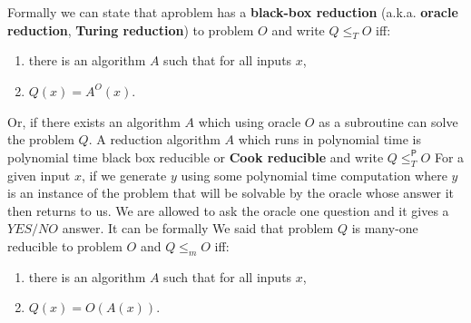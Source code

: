 Formally we can state that aproblem has a \textbf{black-box reduction} (a.k.a. \textbf{oracle reduction}, \textbf{Turing reduction}) to problem $O$ and write $Q \leq_T O$ iff:
\begin{enumerate}[nolistsep]
    \item there is an algorithm $A$ such that for all inputs $x$,
    \item $Q(x) = A^O(x)$.
\end{enumerate}

Or, if there exists an algorithm $A$ which using oracle $O$ as a subroutine can solve the problem $Q$. A reduction algorithm $A$ which runs in polynomial time is polynomial time black box reducible or \textbf{Cook reducible} and 
write $Q\leq^\mathsf{P}_T O$ For a given input $x$,  if we generate $y$ using some polynomial time computation where $y$ is an instance of the problem that will be solvable by the oracle whose answer it then returns to us. We are allowed to ask the oracle one question and it gives a $YES/NO$ answer. It can be formally We said that problem $Q$ is many-one reducible to problem $O$ and $Q \leq_m O$ iff:
\begin{enumerate}[nolistsep]
    \item there is an algorithm $A$ such that for all inputs $x$,  
    \item $Q(x) = O(A(x))$.
\end{enumerate}